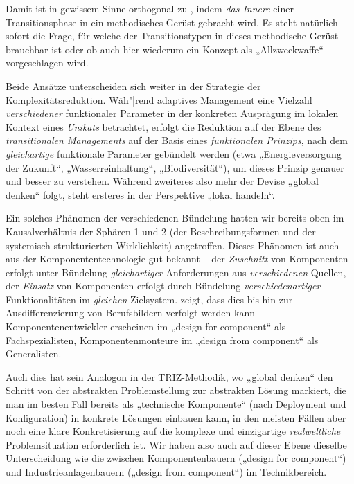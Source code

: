 \documentclass[12pt,a4paper]{article}
\begin{document}
Damit ist \cite{Foxon2009} in gewissem Sinne orthogonal zu \cite{Geels2007},
indem \emph{das Innere} einer Transitionsphase in ein methodisches Gerüst
gebracht wird.  Es steht natürlich sofort die Frage, für welche der
Transitionstypen in \cite{Geels2007} dieses methodische Gerüst brauchbar ist
oder ob auch hier wiederum ein Konzept als „Allzweckwaffe“ vorgeschlagen wird.

Beide Ansätze unterscheiden sich weiter in der Strategie der
Komplexitätsreduktion.  Wäh"|rend adaptives Management eine Vielzahl
\emph{verschiedener} funktionaler Parameter in der konkreten Ausprägung im
lokalen Kontext eines \emph{Unikats} betrachtet, erfolgt die Reduktion auf der
Ebene des \emph{transitionalen Managements} auf der Basis eines
\emph{funktionalen Prinzips}, nach dem \emph{gleichartige} funktionale
Parameter gebündelt werden (etwa „Energieversorgung der Zukunft“,
„Wasserreinhaltung“, „Biodiversität“), um dieses Prinzip genauer und besser zu
verstehen. Während zweiteres also mehr der Devise „global denken“ folgt, steht
ersteres in der Perspektive „lokal handeln“.

Ein solches Phänomen der verschiedenen Bündelung hatten wir bereits oben im
Kausalverhältnis der Sphären 1 und 2 (der Beschreibungsformen und der
systemisch strukturierten Wirklichkeit) angetroffen. Dieses Phänomen ist auch
aus der Komponententechnologie \cite{Szyperski2002} gut bekannt -- der
\emph{Zuschnitt} von Komponenten erfolgt unter Bündelung \emph{gleichartiger}
Anforderungen aus \emph{verschiedenen} Quellen, der \emph{Einsatz} von
Komponenten erfolgt durch Bündelung \emph{verschiedenartiger} Funktionalitäten
im \emph{gleichen} Zielsystem.  \cite{Szyperski2002} zeigt, dass dies bis hin
zur Ausdifferenzierung von Berufsbildern verfolgt werden kann --
Komponentenentwickler erscheinen im „design for component“ als
Fachspezialisten, Komponentenmonteure im „design from component“ als
Generalisten.

Auch dies hat sein Analogon in der TRIZ-Methodik, wo „global denken“ den
Schritt von der abstrakten Problemstellung zur abstrakten Lösung markiert, die
man im besten Fall bereits als „technische Komponente“ (nach Deployment und
Konfiguration) in konkrete Lösungen einbauen kann, in den meisten Fällen aber
noch eine klare Konkretisierung auf die komplexe und einzigartige
\emph{realweltliche} Problemsituation erforderlich ist.  Wir haben also auch
auf dieser Ebene dieselbe Unterscheidung wie die zwischen Komponentenbauern
(„design for component“) und Industrieanlagenbauern („design from component“)
im Technikbereich.
\end{document}
